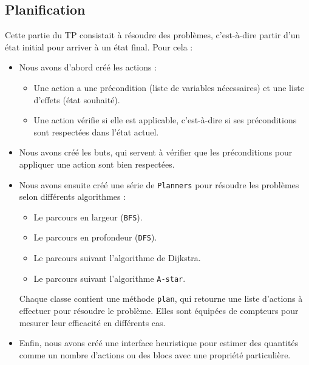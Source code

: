 \documentclass[12pt]{article}
\begin{document}
        \subsection{Planification}
            Cette partie du TP consistait à résoudre des problèmes, c'est-à-dire partir d'un état initial pour arriver à un état final. Pour cela :
            \begin{itemize}
                \item Nous avons d’abord créé les actions :
                    \begin{itemize}
                        \item Une action a une précondition (liste de variables nécessaires) et une liste d’effets (état souhaité).
                        \item Une action vérifie si elle est applicable, c'est-à-dire si ses préconditions sont respectées dans l'état actuel.
                    \end{itemize}
                \item Nous avons créé les buts, qui servent à vérifier que les préconditions pour appliquer une action sont bien respectées.
                \item Nous avons ensuite créé une série de \texttt{Planners} pour résoudre les problèmes selon différents algorithmes :
                    \begin{itemize}
                        \item Le parcours en largeur (\texttt{BFS}).
                        \item Le parcours en profondeur (\texttt{DFS}).
                        \item Le parcours suivant l'algorithme de Dijkstra.
                        \item Le parcours suivant l'algorithme \texttt{A-star}.
                    \end{itemize}
                    Chaque classe contient une méthode \texttt{plan}, qui retourne une liste d’actions à effectuer pour résoudre le problème. Elles sont équipées de compteurs pour mesurer leur efficacité en différents cas.
                \item Enfin, nous avons créé une interface heuristique pour estimer des quantités comme un nombre d’actions ou des blocs avec une propriété particulière.
            \end{itemize}
\end{document}

